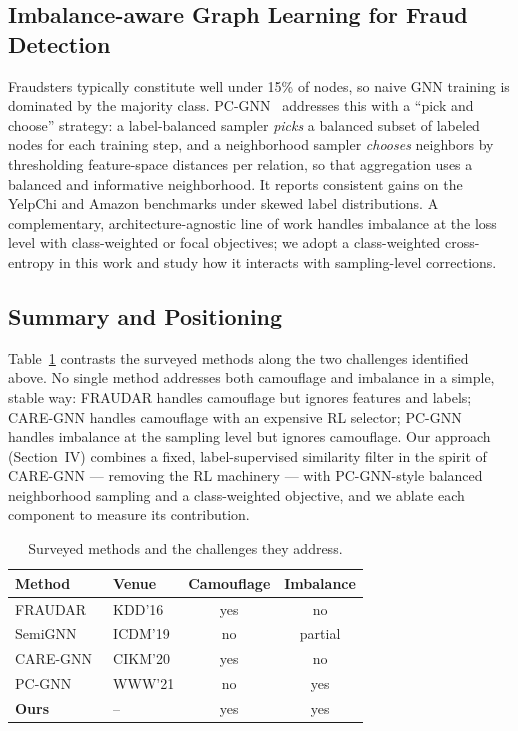 \documentclass[conference]{IEEEtran}
\begin{document}
\subsection{Imbalance-aware Graph Learning for Fraud Detection}
Fraudsters typically constitute well under 15\% of nodes, so naive GNN
training is dominated by the majority class. PC-GNN~\cite{DBLP:conf/www/LiuAQCFYH21}
addresses this with a ``pick and choose'' strategy: a label-balanced
sampler \emph{picks} a balanced subset of labeled nodes for each training
step, and a neighborhood sampler \emph{chooses} neighbors by thresholding
feature-space distances per relation, so that aggregation uses a balanced
and informative neighborhood. It reports consistent gains on the YelpChi
and Amazon benchmarks under skewed label distributions. A complementary,
architecture-agnostic line of work handles imbalance at the loss level
with class-weighted or focal objectives; we adopt a class-weighted
cross-entropy in this work and study how it interacts with sampling-level
corrections.

\subsection{Summary and Positioning}
Table~\ref{tab:methods} contrasts the surveyed methods along the two
challenges identified above. No single method addresses both camouflage
and imbalance in a simple, stable way: FRAUDAR handles camouflage but
ignores features and labels; CARE-GNN handles camouflage with an
expensive RL selector; PC-GNN handles imbalance at the sampling level
but ignores camouflage. Our approach (Section~IV) combines a fixed,
label-supervised similarity filter in the spirit of CARE-GNN --- removing
the RL machinery --- with PC-GNN-style balanced neighborhood sampling and
a class-weighted objective, and we ablate each component to measure its
contribution.

\begin{table}[t]
\centering
\caption{Surveyed methods and the challenges they address.}
\label{tab:methods}
\begin{tabular}{llcc}
\hline
\textbf{Method} & \textbf{Venue} & \textbf{Camouflage} & \textbf{Imbalance} \\
\hline
FRAUDAR~\cite{DBLP:conf/kdd/HooiSBSSF16} & KDD'16 & yes & no \\
SemiGNN~\cite{DBLP:conf/icdm/WangQL0JWFYZY19} & ICDM'19 & no & partial \\
CARE-GNN~\cite{DBLP:conf/cikm/DouL0DPY20} & CIKM'20 & yes & no \\
PC-GNN~\cite{DBLP:conf/www/LiuAQCFYH21} & WWW'21 & no & yes \\
\textbf{Ours} & -- & yes & yes \\
\hline
\end{tabular}
\end{table}
\end{document}
